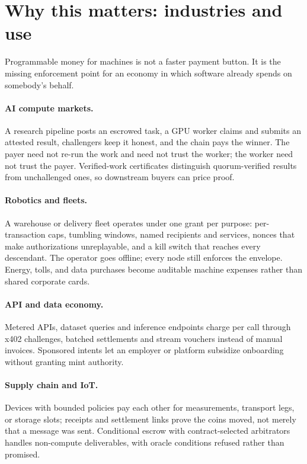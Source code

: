 \documentclass{article}
\begin{document}
\section{Why this matters: industries and use}
\label{sec:industries}

Programmable money for machines is not a faster payment button. It is the
missing enforcement point for an economy in which software already spends on
somebody's behalf.

\paragraph{AI compute markets.} A research pipeline posts an escrowed task, a
GPU worker claims and submits an attested result, challengers keep it honest,
and the chain pays the winner. The payer need not re-run the work and need not
trust the worker; the worker need not trust the payer. Verified-work
certificates distinguish quorum-verified results from unchallenged ones, so
downstream buyers can price proof.

\paragraph{Robotics and fleets.} A warehouse or delivery fleet operates under one
grant per purpose: per-transaction caps, tumbling windows, named recipients and
services, nonces that make authorizations unreplayable, and a kill switch that
reaches every descendant. The operator goes offline; every node still enforces
the envelope. Energy, tolls, and data purchases become auditable machine
expenses rather than shared corporate cards.

\paragraph{API and data economy.} Metered APIs, dataset queries and inference
endpoints charge per call through x402 challenges, batched settlements and
stream vouchers instead of manual invoices. Sponsored intents let an employer or
platform subsidize onboarding without granting mint authority.

\paragraph{Supply chain and IoT.} Devices with bounded policies pay each other
for measurements, transport legs, or storage slots; receipts and settlement
links prove the coins moved, not merely that a message was sent. Conditional
escrow with contract-selected arbitrators handles non-compute deliverables, with
oracle conditions refused rather than promised.
\end{document}
